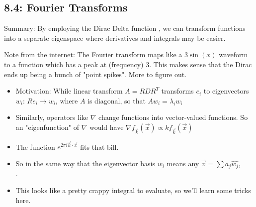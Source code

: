 \documentclass[11pt, oneside]{article}   	%
\begin{document}
\subsection{8.4: Fourier Transforms}

Summary: By employing the Dirac Delta function , we can transform functions into a separate eigenspace where derivatives and integrals may be easier.

Note from the internet: The Fourier transform maps like a $3\sin(x)$ waveform to a function which has a peak at (frequency) $3$.  This makes sense that the Dirac ends up being a bunch of "point spikes".  More to figure out.

\begin{itemize}
\item Motivation: While linear transform $A = RDR^T$ transforms $e_i$ to eigenvectors $w_i$: $Re_i \rightarrow w_i$, where $A$ is diagonal, so that $Aw_i = \lambda_iw_i$
\item Similarly, operators like $\nabla$ change functions into vector-valued functions.  So an "eigenfunction" of $\nabla$ would have $\nabla f_{\vec{k}}(\vec{x}) \propto  k  f_{\vec{k}}(\vec{x})  $
\item The function $e^{2\pi i \vec{k} \cdot \vec{x}}$ fits that bill.
\item So in the same way that the eigenvector basis $w_i$ means any $\vec{v} = \sum a_j \hat{w_j}$,
\\
 .
 \item This looks like a pretty crappy integral to evaluate, so we'll learn some tricks here.
\end{itemize}
\end{document}

